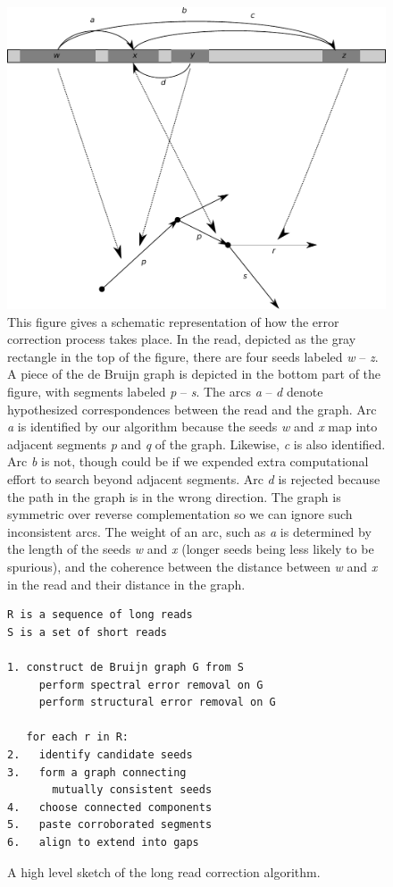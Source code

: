 \documentclass[twocolumn]{article}
\begin{document}
\begin{figure}
\begin{center}
\includegraphics[scale=0.5]{scheme.pdf}
\end{center}
\caption{
This figure gives a schematic representation of how the error
correction process takes place.  In the read, depicted as the gray
rectangle in the top of the figure, there are four seeds labeled
\textsl{w} -- \textsl{z}. A piece of the de Bruijn graph is depicted
in the bottom part of the figure, with segments labeled \textsl{p}
-- \textsl{s}.  The arcs \textsl{a} -- \textsl{d} denote hypothesized
correspondences between the read and the graph.  Arc \textsl{a} is
identified by our algorithm because the seeds \textsl{w} and
\textsl{x} map into adjacent segments \textsl{p} and \textsl{q} of
the graph. Likewise, \textsl{c} is also identified. Arc \textsl{b}
is not, though could be if we expended extra computational effort
to search beyond adjacent segments.  Arc \textsl{d} is rejected
because the path in the graph is in the wrong direction. The graph
is symmetric over reverse complementation so we can ignore such
inconsistent arcs.  The weight of an arc, such as \textsl{a} is
determined by the length of the seeds \textsl{w} and \textsl{x}
(longer seeds being less likely to be spurious), and the coherence
between the distance between \textsl{w} and \textsl{x} in the read
and their distance in the graph.
}
\label{fig:uniqueness}
\end{figure}

\begin{figure}
\label{fig:algo}
\begin{verbatim}
R is a sequence of long reads
S is a set of short reads

1. construct de Bruijn graph G from S
     perform spectral error removal on G
     perform structural error removal on G

   for each r in R:
2.   identify candidate seeds
3.   form a graph connecting
       mutually consistent seeds
4.   choose connected components
5.   paste corroborated segments
6.   align to extend into gaps
\end{verbatim}
\caption{A high level sketch of the long read correction algorithm.}
\end{figure}
\end{document}
